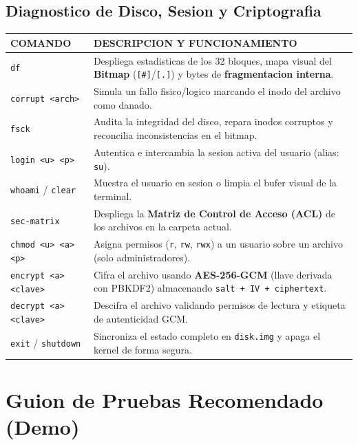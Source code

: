 \documentclass[11pt,a4paper]{article}
\begin{document}
	\subsection{Diagnostico de Disco, Sesion y Criptografia}
	\begin{tabularx}{\textwidth}{|l|X|}
		\hline
		\rowcolor{bordergreen} \color{matrixgreen}\textbf{COMANDO} & \color{matrixgreen}\textbf{DESCRIPCION Y FUNCIONAMIENTO} \\
		\hline
		\rowcolor{termcard} \texttt{df} & Despliega estadisticas de los 32 bloques, mapa visual del \textbf{Bitmap} (\texttt{[\#]}/\texttt{[.]}) y bytes de \textbf{fragmentacion interna}. \\
		\hline
		\rowcolor{bgblack}  \texttt{corrupt <arch>} & Simula un fallo fisico/logico marcando el inodo del archivo como danado. \\
		\hline
		\rowcolor{termcard} \texttt{fsck} & Audita la integridad del disco, repara inodos corruptos y reconcilia inconsistencias en el bitmap. \\
		\hline
		\rowcolor{bgblack}  \texttt{login <u> <p>} & Autentica e intercambia la sesion activa del usuario (alias: \texttt{su}). \\
		\hline
		\rowcolor{termcard} \texttt{whoami} / \texttt{clear} & Muestra el usuario en sesion o limpia el bufer visual de la terminal. \\
		\hline
		\rowcolor{bgblack}  \texttt{sec-matrix} & Despliega la \textbf{Matriz de Control de Acceso (ACL)} de los archivos en la carpeta actual. \\
		\hline
		\rowcolor{termcard} \texttt{chmod <u> <a> <p>} & Asigna permisos (\texttt{r}, \texttt{rw}, \texttt{rwx}) a un usuario sobre un archivo (solo administradores). \\
		\hline
		\rowcolor{bgblack}  \texttt{encrypt <a> <clave>} & Cifra el archivo usando \textbf{AES-256-GCM} (llave derivada con PBKDF2) almacenando \texttt{salt + IV + ciphertext}. \\
		\hline
		\rowcolor{termcard} \texttt{decrypt <a> <clave>} & Descifra el archivo validando permisos de lectura y etiqueta de autenticidad GCM. \\
		\hline
		\rowcolor{bgblack}  \texttt{exit} / \texttt{shutdown} & Sincroniza el estado completo en \texttt{disk.img} y apaga el kernel de forma segura. \\
		\hline
	\end{tabularx}
	
	\section{Guion de Pruebas Recomendado (Demo)}
	
\end{document}
